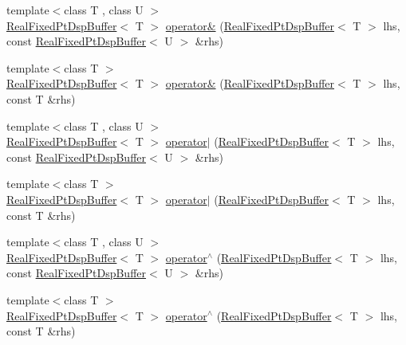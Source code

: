 \begin{DoxyCompactItemize}
\item 
{\footnotesize template$<$class T , class U $>$ }\\\hyperlink{class_smart_dsp_1_1_real_fixed_pt_dsp_buffer}{Real\+Fixed\+Pt\+Dsp\+Buffer}$<$ T $>$ \hyperlink{namespace_smart_dsp_ad8cecea8ddfc7d20fbb97ddd805236e2}{operator\&} (\hyperlink{class_smart_dsp_1_1_real_fixed_pt_dsp_buffer}{Real\+Fixed\+Pt\+Dsp\+Buffer}$<$ T $>$ lhs, const \hyperlink{class_smart_dsp_1_1_real_fixed_pt_dsp_buffer}{Real\+Fixed\+Pt\+Dsp\+Buffer}$<$ U $>$ \&rhs)
\item 
{\footnotesize template$<$class T $>$ }\\\hyperlink{class_smart_dsp_1_1_real_fixed_pt_dsp_buffer}{Real\+Fixed\+Pt\+Dsp\+Buffer}$<$ T $>$ \hyperlink{namespace_smart_dsp_a70523c67a55ae4fedf131a668c4bf776}{operator\&} (\hyperlink{class_smart_dsp_1_1_real_fixed_pt_dsp_buffer}{Real\+Fixed\+Pt\+Dsp\+Buffer}$<$ T $>$ lhs, const T \&rhs)
\item 
{\footnotesize template$<$class T , class U $>$ }\\\hyperlink{class_smart_dsp_1_1_real_fixed_pt_dsp_buffer}{Real\+Fixed\+Pt\+Dsp\+Buffer}$<$ T $>$ \hyperlink{namespace_smart_dsp_a8473fb0c3cf86e26579e785a3015eb1b}{operator$\vert$} (\hyperlink{class_smart_dsp_1_1_real_fixed_pt_dsp_buffer}{Real\+Fixed\+Pt\+Dsp\+Buffer}$<$ T $>$ lhs, const \hyperlink{class_smart_dsp_1_1_real_fixed_pt_dsp_buffer}{Real\+Fixed\+Pt\+Dsp\+Buffer}$<$ U $>$ \&rhs)
\item 
{\footnotesize template$<$class T $>$ }\\\hyperlink{class_smart_dsp_1_1_real_fixed_pt_dsp_buffer}{Real\+Fixed\+Pt\+Dsp\+Buffer}$<$ T $>$ \hyperlink{namespace_smart_dsp_aa770a929b95c95a18e7ac763db235e61}{operator$\vert$} (\hyperlink{class_smart_dsp_1_1_real_fixed_pt_dsp_buffer}{Real\+Fixed\+Pt\+Dsp\+Buffer}$<$ T $>$ lhs, const T \&rhs)
\item 
{\footnotesize template$<$class T , class U $>$ }\\\hyperlink{class_smart_dsp_1_1_real_fixed_pt_dsp_buffer}{Real\+Fixed\+Pt\+Dsp\+Buffer}$<$ T $>$ \hyperlink{namespace_smart_dsp_a5b4a8c70e37090c0c6f6b88e0775a3c6}{operator$^\wedge$} (\hyperlink{class_smart_dsp_1_1_real_fixed_pt_dsp_buffer}{Real\+Fixed\+Pt\+Dsp\+Buffer}$<$ T $>$ lhs, const \hyperlink{class_smart_dsp_1_1_real_fixed_pt_dsp_buffer}{Real\+Fixed\+Pt\+Dsp\+Buffer}$<$ U $>$ \&rhs)
\item 
{\footnotesize template$<$class T $>$ }\\\hyperlink{class_smart_dsp_1_1_real_fixed_pt_dsp_buffer}{Real\+Fixed\+Pt\+Dsp\+Buffer}$<$ T $>$ \hyperlink{namespace_smart_dsp_ae9fd8e571c7c3489d61424919fa36374}{operator$^\wedge$} (\hyperlink{class_smart_dsp_1_1_real_fixed_pt_dsp_buffer}{Real\+Fixed\+Pt\+Dsp\+Buffer}$<$ T $>$ lhs, const T \&rhs)

\end{DoxyCompactItemize}
